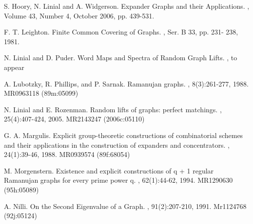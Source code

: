 \documentclass[12pt]{article}
\newtheorem{open question}[theorem]{Open question}
\begin{document}
\begin{thebibliography}{FMT06}
S. Hoory, N. Linial and A. Widgerson.
\newblock Expander Graphs and their Applications.
, Volume 43, Number 4, October 2006, pp. 439-531.

F. T. Leighton.
\newblock Finite Common Covering of Graphs.
, Ser. B 33, pp. 231- 238, 1981.

N. Linial and D. Puder.
\newblock Word Maps and Spectra of Random Graph Lifts.
, to appear

A. Lubotzky, R. Phillips, and P. Sarnak.
\newblock Ramanujan graphs.
, 8(3):261-277, 1988. MR0963118 (89m:05099)

N. Linial and E. Rozenman.
\newblock Random lifts of graphs: perfect matchings.
, 25(4):407-424, 2005. MR2143247 (2006c:05110)

G. A. Margulis.
\newblock Explicit group-theoretic constructions of combinatorial schemes and their applications in the construction of expanders and concentrators.
, 24(1):39-46, 1988. MR0939574 (89f:68054)

M. Morgenstern.
\newblock Existence and explicit constructions of q + 1 regular Ramanujan graphs for every prime power q.
, 62(1):44-62, 1994. MR1290630 (95h:05089)

A. Nilli.
\newblock On the Second Eigenvalue of a Graph.
, 91(2):207-210, 1991. Mr1124768 (92j:05124)

\end{thebibliography}
\end{document}
